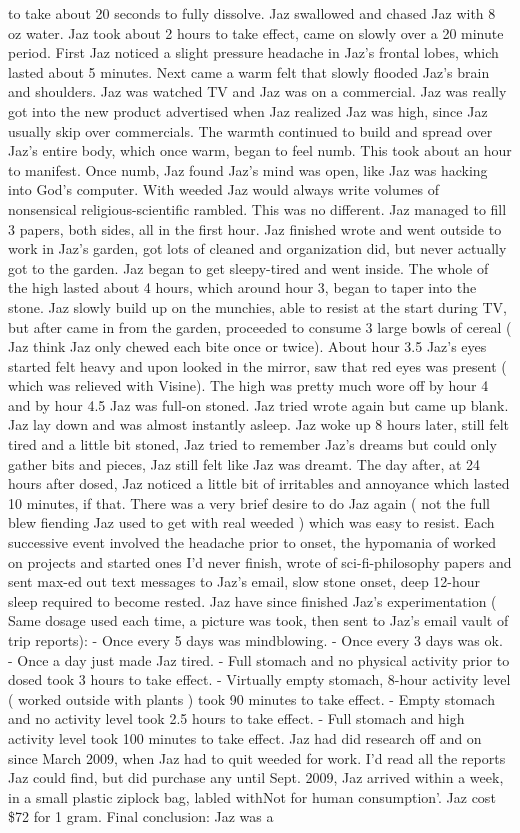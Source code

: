 \documentclass[12pt]{book}
\begin{document}
to take about 20 seconds to fully dissolve. Jaz swallowed and chased Jaz with 8 oz water. Jaz took about 2 hours to take effect, came on slowly over a 20 minute period. First Jaz noticed a slight pressure headache in Jaz's frontal lobes, which lasted about 5 minutes. Next came a warm felt that slowly flooded Jaz's brain and shoulders. Jaz was watched TV and Jaz was on a commercial. Jaz was really got into the new product advertised when Jaz realized Jaz was high, since Jaz usually skip over commercials. The warmth continued to build and spread over Jaz's entire body, which once warm, began to feel numb. This took about an hour to manifest. Once numb, Jaz found Jaz's mind was open, like Jaz was hacking into God's computer. With weeded Jaz would always write volumes of nonsensical religious-scientific rambled. This was no different. Jaz managed to fill 3 papers, both sides, all in the first hour. Jaz finished wrote and went outside to work in Jaz's garden, got lots of cleaned and organization did, but never actually got to the garden. Jaz began to get sleepy-tired and went inside. The whole of the high lasted about 4 hours, which around hour 3, began to taper into the stone. Jaz slowly build up on the munchies, able to resist at the start during TV, but after came in from the garden, proceeded to consume 3 large bowls of cereal ( Jaz think Jaz only chewed each bite once or twice). About hour 3.5 Jaz's eyes started felt heavy and upon looked in the mirror, saw that red eyes was present ( which was relieved with Visine). The high was pretty much wore off by hour 4 and by hour 4.5 Jaz was full-on stoned. Jaz tried wrote again but came up blank. Jaz lay down and was almost instantly asleep. Jaz woke up 8 hours later, still felt tired and a little bit stoned, Jaz tried to remember Jaz's dreams but could only gather bits and pieces, Jaz still felt like Jaz was dreamt. The day after, at 24 hours after dosed, Jaz noticed a little bit of irritables and annoyance which lasted 10 minutes, if that. There was a very brief desire to do Jaz again ( not the full blew fiending Jaz used to get with real weeded ) which was easy to resist. Each successive event involved the headache prior to onset, the hypomania of worked on projects and started ones I'd never finish, wrote of sci-fi-philosophy papers and sent max-ed out text messages to Jaz's email, slow stone onset, deep 12-hour sleep required to become rested. Jaz have since finished Jaz's experimentation ( Same dosage used each time, a picture was took, then sent to Jaz's email vault of trip reports): - Once every 5 days was mindblowing. - Once every 3 days was ok. - Once a day just made Jaz tired. - Full stomach and no physical activity prior to dosed took 3 hours to take effect. - Virtually empty stomach, 8-hour activity level ( worked outside with plants ) took 90 minutes to take effect. - Empty stomach and no activity level took 2.5 hours to take effect. - Full stomach and high activity level took 100 minutes to take effect. Jaz had did research off and on since March 2009, when Jaz had to quit weeded for work. I'd read all the reports Jaz could find, but did purchase any until Sept. 2009, Jaz arrived within a week, in a small plastic ziplock bag, labled withNot for human consumption'. Jaz cost \$72 for 1 gram. Final conclusion: Jaz was a 
\end{document}
